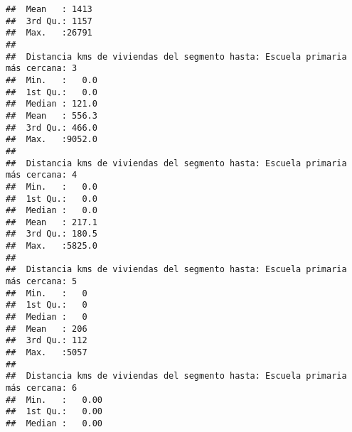 \documentclass[11pt,]{article}
\begin{document}
\begin{verbatim}
##  Mean   : 1413                                                                 
##  3rd Qu.: 1157                                                                 
##  Max.   :26791                                                                 
##                                                                                
##  Distancia kms de viviendas del segmento hasta: Escuela primaria más cercana: 3
##  Min.   :   0.0                                                                
##  1st Qu.:   0.0                                                                
##  Median : 121.0                                                                
##  Mean   : 556.3                                                                
##  3rd Qu.: 466.0                                                                
##  Max.   :9052.0                                                                
##                                                                                
##  Distancia kms de viviendas del segmento hasta: Escuela primaria más cercana: 4
##  Min.   :   0.0                                                                
##  1st Qu.:   0.0                                                                
##  Median :   0.0                                                                
##  Mean   : 217.1                                                                
##  3rd Qu.: 180.5                                                                
##  Max.   :5825.0                                                                
##                                                                                
##  Distancia kms de viviendas del segmento hasta: Escuela primaria más cercana: 5
##  Min.   :   0                                                                  
##  1st Qu.:   0                                                                  
##  Median :   0                                                                  
##  Mean   : 206                                                                  
##  3rd Qu.: 112                                                                  
##  Max.   :5057                                                                  
##                                                                                
##  Distancia kms de viviendas del segmento hasta: Escuela primaria más cercana: 6
##  Min.   :   0.00                                                               
##  1st Qu.:   0.00                                                               
##  Median :   0.00                                                               

\end{verbatim}
\end{document}
